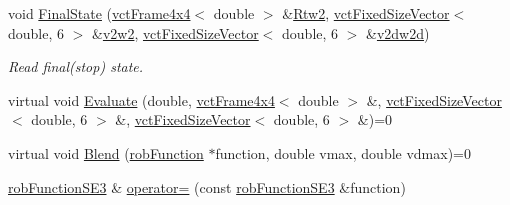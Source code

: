 \begin{DoxyCompactItemize}
void \hyperlink{classrob_function_s_e3_af7f247aa30a789651bd23b367d7f1eb7}{Final\-State} (\hyperlink{classvct_frame4x4}{vct\-Frame4x4}$<$ double $>$ \&\hyperlink{classrob_function_s_e3_a06d362ebf89c4f6a3984c4097a810a27}{Rtw2}, \hyperlink{classvct_fixed_size_vector}{vct\-Fixed\-Size\-Vector}$<$ double, 6 $>$ \&\hyperlink{classrob_function_s_e3_a9e6845bf899f02dcab9dc56d59923787}{v2w2}, \hyperlink{classvct_fixed_size_vector}{vct\-Fixed\-Size\-Vector}$<$ double, 6 $>$ \&\hyperlink{classrob_function_s_e3_ab91a09514cf4b5f4b2626ed8e44133c0}{v2dw2d})
\begin{DoxyCompactList}\small\item\em Read final(stop) state. \end{DoxyCompactList}\item 
virtual void \hyperlink{classrob_function_s_e3_ac1f7e6113e1ed359e15290e09df9e012}{Evaluate} (double, \hyperlink{classvct_frame4x4}{vct\-Frame4x4}$<$ double $>$ \&, \hyperlink{classvct_fixed_size_vector}{vct\-Fixed\-Size\-Vector}$<$ double, 6 $>$ \&, \hyperlink{classvct_fixed_size_vector}{vct\-Fixed\-Size\-Vector}$<$ double, 6 $>$ \&)=0
\item 
virtual void \hyperlink{classrob_function_s_e3_a2778648e88046019c07c703b8e808e8e}{Blend} (\hyperlink{classrob_function}{rob\-Function} $\ast$function, double vmax, double vdmax)=0
\item 
\hyperlink{classrob_function_s_e3}{rob\-Function\-S\-E3} \& \hyperlink{classrob_function_s_e3_a8bf41748f306c77e2babbba445e157c5}{operator=} (const \hyperlink{classrob_function_s_e3}{rob\-Function\-S\-E3} \&function)
\end{DoxyCompactItemize}
